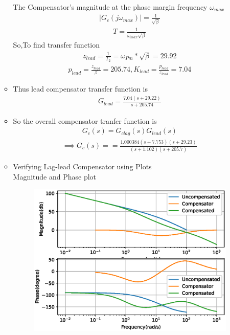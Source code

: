 \begin{enumerate}[label=\thesubsection.\arabic*.,ref=\thesubsection.\theenumi]
\begin{itemize}
The Compensator's magnitude at the phase margin frequency $\omega_{max}$
\begin{align}
     |G_{c}(j\omega_{max})| = \frac{1}{\sqrt{\beta}} 
\end{align}
\begin{align}
    T = \frac{1}{\omega_{max}\sqrt{\beta}}
\end{align}
So,To find transfer function
\begin{align}
    z_{lead}=\frac{1}{T_{2}}=\omega_{Pm}*\sqrt{\beta}=29.92
\end{align}
\begin{align}
    p_{lead}=\frac{z_{lead}}{\beta}=205.74,K_{lead}=\frac{p_{lead}}{z_{lead}}=7.04
\end{align}
\item Thus lead compensator transfer function is 
\begin{align}
    G_{lead}= \frac{7.04(s+29.22)}{s+205.74} 
\end{align}
\item So the overall compensator tranfer function is
\begin{align}
    G_{c}(s) = G_{clag}(s)G_{lead}(s)
\end{align}
\begin{align}
\implies G_{c}(s)==\frac{1.000384(s+7.753)(s+29.23)}{(s+1.102)(s+205.7)}
\end{align}

\end{itemize}
\begin{itemize}
 
\item Verifying Lag-lead Compensator using Plots
\\
\solution 
Magnitude and Phase plot
\begin{figure}[!h]
\centering
  \includegraphics[width=1.5\columnwidth]{./figs/ee18btech11012/ee18btech11012_2.eps}
\caption{}
\label{fig:ee18btech11012_a} 
\end{figure}



\end{itemize}
\end{enumerate}
